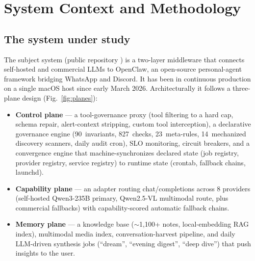 \section{System Context and Methodology}\label{sec:method}

\subsection{The system under study}\label{sec:system}

The subject system (public repository \sysname{}) is a two-layer
middleware that connects self-hosted and commercial LLMs to OpenClaw, an
open-source personal-agent framework bridging WhatsApp and Discord. It
has been in continuous production on a single macOS host since early
March 2026. Architecturally it follows a three-plane design
(Fig.~\ref{fig:planes}):

\begin{itemize}
\item \textbf{Control plane} --- a tool-governance proxy (tool filtering
to a hard cap, schema repair, alert-context stripping, custom tool
interception), a declarative governance engine (90~invariants,
827~checks, 23~meta-rules, 14~mechanized discovery scanners, daily audit
cron), SLO monitoring, circuit breakers, and a convergence engine that
machine-synchronizes declared state (job registry, provider registry,
service registry) to runtime state (crontab, fallback chains, launchd).
\item \textbf{Capability plane} --- an adapter routing chat/completions
across 8 providers (self-hosted Qwen3-235B primary, Qwen2.5-VL multimodal
route, plus commercial fallbacks) with capability-scored automatic
fallback chains.
\item \textbf{Memory plane} --- a knowledge base ($\sim$1{,}100+ notes,
local-embedding RAG index), multimodal media index, conversation-harvest
pipeline, and daily LLM-driven synthesis jobs (``dream'', ``evening
digest'', ``deep dive'') that push insights to the user.
\end{itemize}

